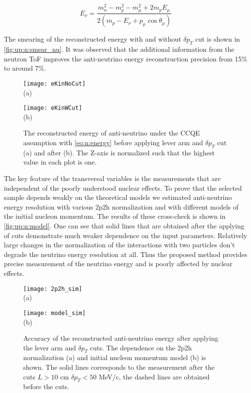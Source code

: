 \documentclass[main.tex]{subfiles}
\begin{document}
\begin{equation}
  \label{eq:n:energy}
  E_\nu=\frac{m^2_n-m^2_p-m^2_\mu+2m_p E_\mu}{2\left(m_p-E_\nu+p_\mu \cos\theta_\mu\right)}
\end{equation}

The smearing of the reconstructed energy with and without $\delta p_T$ cut is shown in \autoref{fig:up:n:smear_nu}. It was observed that the additional information from the neutron ToF improves the anti-neutrino energy reconstruction precision from 15\% to around 7\%.

\begin{figure}[!ht]
  \centering
  \begin{minipage}{0.49\linewidth}
    \centering
    \texttt{[image: eKinNoCut]} \\ (a)
  \end{minipage}
  \begin{minipage}{0.49\linewidth}
    \centering
    \texttt{[image: eKinWCut]} \\ (b)
  \end{minipage}
  \caption{The reconstructed energy of anti-neutrino under the CCQE assumption with \autoref{eq:n:energy} before applying lever arm and $\delta p_T$ cut (a) and after (b). The Z-axis is normalized such that the highest value in each plot is one.}
  \label{fig:up:n:smear_nu}
\end{figure}

The key feature of the transversal variables is the measurements that are independent of the poorly understood nuclear effects. To prove that the selected sample depends weakly on the theoretical models we estimated anti-neutrino energy resolution with various 2p2h normalization and with different models of the initial nucleon momentum. The results of these cross-check is shown in \autoref{fig:up:n:model}. One can see that solid lines that are obtained after the applying of cuts demonstrate much weaker dependence on the input parameters. Relatively large changes in the normalization of the interactions with two particles don't degrade the neutrino energy resolution at all. Thus the proposed method provides precise measurement of the neutrino energy and is poorly affected by nuclear effects.

\begin{figure}[!ht]
  \centering
  \begin{minipage}{0.49\linewidth}
    \centering
    \texttt{[image: 2p2h\_sim]} \\ (a)
  \end{minipage}
  \begin{minipage}{0.49\linewidth}
    \centering
    \texttt{[image: model\_sim]} \\ (b)
  \end{minipage}
  \caption{Accuracy of the reconstructed anti-neutrino energy after applying the lever arm and $\delta p_T$ cuts. The dependence on the 2p2h normalization (a) and initial nucleon momentum model (b) is shown. The solid lines corresponds to the measurement after the cuts $L>10$ cm $\delta p_T < 50$ MeV/c, the dashed lines are obtained before the cuts.}
  \label{fig:up:n:model}
\end{figure}
\end{document}
